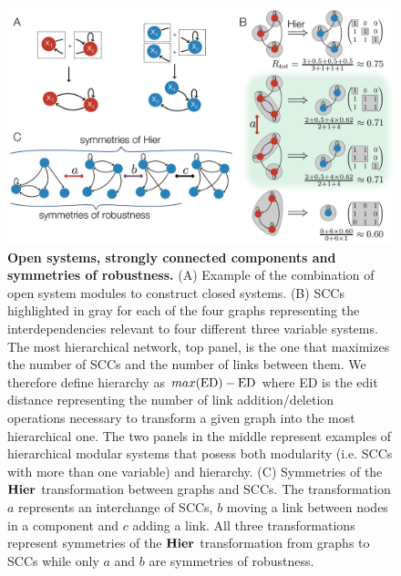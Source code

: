 \begin{figure}[!ht]
\centering
\noindent\includegraphics[width=0.9\columnwidth]{fig/modsccsym.pdf}
\caption{{\bf Open systems, strongly connected components and symmetries of robustness.} (A) Example of the combination of open system modules to construct closed systems. (B) SCCs highlighted in gray for each of the four graphs representing the interdependencies relevant to four different three variable systems. The most hierarchical network, top panel, is the one that maximizes the number of SCCs and the number of links between them. We therefore define hierarchy as $max(\hbox{ED}) - \hbox{ED}$ where ED is the edit distance representing the number of link addition/deletion operations necessary to transform a given graph into the most hierarchical one. The two panels in the middle represent examples of hierarchical modular systems that posess both modularity (i.e. SCCs with more than one variable) and hierarchy. (C) Symmetries of the $\mathbf{Hier}$ transformation between graphs and SCCs. The transformation $a$ represents an interchange of SCCs, $b$ moving a link between nodes in a component and $c$ adding a link. All three transformations represent symmetries of the $\mathbf{Hier}$ transformation from graphs to SCCs while only $a$ and $b$ are symmetries of robustness.}
\label{fig:modsccsym}
\end{figure}

\pagebreak



